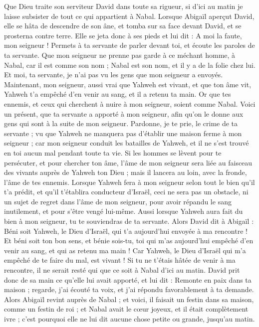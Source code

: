 \begin{multicols}{2}
Que Dieu traite son serviteur David dans toute sa rigueur, si d'ici au matin je laisse subsister de tout ce qui appartient à Nabal.
Lorsque Abigaïl aperçut David, elle se hâta de descendre de son âne, et tomba sur sa face devant David, et se prosterna contre terre.
Elle se jeta donc à ses pieds et lui dit : A moi la faute, mon seigneur ! Permets à ta servante de parler devant toi, et écoute les paroles de ta servante.
Que mon seigneur ne prenne pas garde à ce méchant homme, à Nabal, car il est comme son nom ; Nabal est son nom, et il y a de la folie chez lui. Et moi, ta servante, je n'ai pas vu les gens que mon seigneur a envoyés.
Maintenant, mon seigneur, aussi vrai que Yahweh est vivant, et que ton âme vit, Yahweh t'a empêché d'en venir au sang, et il a retenu ta main. Or que tes ennemis, et ceux qui cherchent à nuire à mon seigneur, soient comme Nabal.
Voici un présent, que ta servante a apporté à mon seigneur, afin qu'on le donne aux gens qui sont à la suite de mon seigneur.
Pardonne, je te prie, le crime de ta servante ; vu que Yahweh ne manquera pas d'établir une maison ferme à mon seigneur ; car mon seigneur conduit les batailles de Yahweh, et il ne s'est trouvé en toi aucun mal pendant toute ta vie.
Si les hommes se lèvent pour te persécuter, et pour chercher ton âme, l'âme de mon seigneur sera liée au faisceau des vivants auprès de Yahweh ton Dieu ; mais il lancera au loin, avec la fronde, l'âme de tes ennemis.
Lorsque Yahweh fera à mon seigneur selon tout le bien qu'il t'a prédit, et qu’il t'établira conducteur d'Israël,
ceci ne sera pas un obstacle, ni un sujet de regret dans l'âme de mon seigneur, pour avoir répandu le sang inutilement, et pour s'être vengé lui-même. Aussi lorsque Yahweh aura fait du bien à mon seigneur, tu te souviendras de ta servante.
Alors David dit à Abigaïl : Béni soit Yahweh, le Dieu d'Israël, qui t'a aujourd'hui envoyée à ma rencontre !
Et béni soit ton bon sens, et bénie sois-tu, toi qui m'as aujourd'hui empêché d'en venir au sang, et qui as retenu ma main !
Car Yahweh, le Dieu d'Israël qui m'a empêché de te faire du mal, est vivant ! Si tu ne t’étais hâtée de venir à ma rencontre, il ne serait resté qui que ce soit à Nabal d'ici au matin.
David prit donc de sa main ce qu'elle lui avait apporté, et lui dit : Remonte en paix dans ta maison ; regarde, j'ai écouté ta voix, et j'ai répondu favorablement à ta demande.
Alors Abigaïl revint auprès de Nabal ; et voici, il faisait un festin dans sa maison, comme un festin de roi ; et Nabal avait le cœur joyeux, et il était complètement ivre ; c'est pourquoi elle ne lui dit aucune chose petite ou grande, jusqu'au matin.

\end{multicols}
